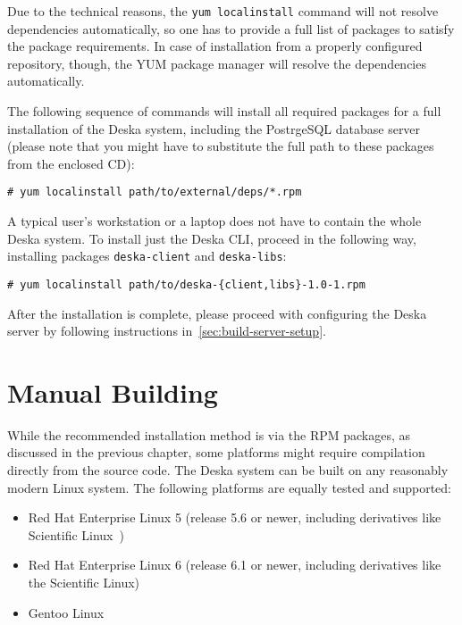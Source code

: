 \documentclass[deska]{subfiles}
\begin{document}
Due to the technical reasons, the {\tt yum localinstall} command will not resolve dependencies automatically, so one has
to provide a full list of packages to satisfy the package requirements.  In case of installation from a properly
configured repository, though, the YUM package manager will resolve the dependencies automatically.

The following sequence of commands will install all required packages for a full installation of the Deska system,
including the PostrgeSQL database server (please note that you might have to substitute the full path to these packages
from the enclosed CD):


\begin{verbatim}
# yum localinstall path/to/external/deps/*.rpm
\end{verbatim}

A typical user's workstation or a laptop does not have to contain the whole Deska system.  To install just the Deska
CLI, proceed in the following way, installing packages {\tt deska-client} and {\tt deska-libs}:

\begin{verbatim}
# yum localinstall path/to/deska-{client,libs}-1.0-1.rpm
\end{verbatim}

After the installation is complete, please proceed with configuring the Deska server by following instructions
in~\ref{sec:build-server-setup}.

\section{Manual Building}

While the recommended installation method is via the RPM packages, as discussed in the previous chapter, some platforms
might require compilation directly from the source code.  The Deska system can be built on any reasonably modern Linux
system.  The following platforms are equally tested and supported:

\begin{itemize}
    \item Red Hat Enterprise Linux \cite{rhel} 5 (release 5.6 or newer, including derivatives like Scientific
        Linux~\cite{scientific-linux})
    \item Red Hat Enterprise Linux 6 (release 6.1 or newer, including derivatives like the Scientific Linux)
    \item Gentoo Linux~\cite{gentoo}
\end{itemize}
\end{document}
